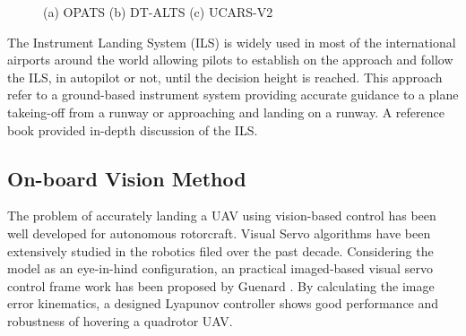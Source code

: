 \begin{figure}[!tb]
	\centering
	\caption{(a) OPATS (b) DT-ALTS (c) UCARS-V2}
\end{figure}

The Instrument Landing System (ILS) is widely used in most of the international airports around the world allowing pilots to establish on the approach and follow the ILS, in autopilot or not, until the decision height is reached. This approach refer to a ground-based instrument system providing accurate guidance to a plane takeing-off from a runway or approaching and landing on a runway. A reference book \cite{Nolan2010} provided in-depth discussion of the ILS.

\subsection{On-board Vision Method}
The problem of accurately landing a UAV using vision-based control has been well developed for autonomous rotorcraft. Visual Servo algorithms have been extensively studied in the robotics filed over the past decade. Considering the model as an eye-in-hind configuration, an practical imaged-based visual servo control frame work has been proposed by Guenard \cite{Guenard2008}. By calculating the image error kinematics, a designed Lyapunov controller shows good performance and robustness of hovering a quadrotor UAV. 

